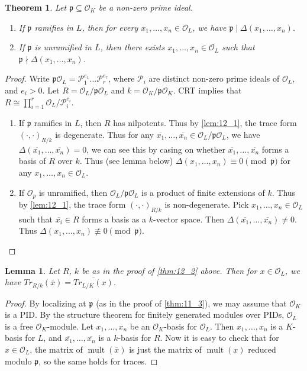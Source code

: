 \documentclass[11pt]{article}
\theoremstyle{definition}
\theoremstyle{plain}
\newtheorem{theorem}[definition]{Theorem}
\newtheorem*{lemma*}{Lemma}
\theoremstyle{remark}
\DeclareMathOperator{\mult}{mult}
\newcommand{\cO}{\mathcal{O}}
\newcommand{\cP}{\mathcal{P}}
\newcommand{\fp}{\mathfrak{p}}
\begin{document}
\begin{theorem}\label{thm:12_2}
    Let $\fp \subseteq \cO_K$ be a non-zero prime ideal.
    \begin{enumerate}
        \item If $\fp$ ramifies in $L$, then for every $x_1, \ldots, x_n \in \cO_L$, we have $\fp \mid \Delta(x_1, \ldots, x_n)$.
        \item If $\fp$ is unramified in $L$, then there exists $x_1, \ldots, x_n \in \cO_L$ such that $\fp \nmid \Delta(x_1, \ldots, x_n)$.
    \end{enumerate}
\end{theorem}
\begin{proof}
    Write $\fp \cO_L = \cP_1^{e_1} \ldots \cP_r^{e_r}$, where $\cP_i$ are distinct non-zero prime ideals of $\cO_L$, and $e_i > 0$. Let $R = \cO_L / \fp \cO_L$ and $k = \cO_K / \fp \cO_K$. CRT implies that $R \cong \prod_{i=1}^r \cO_L / \cP_i^{e_i}$.
    \begin{enumerate}
        \item If $\fp$ ramifies in $L$, then $R$ has nilpotents. Thus by \autoref{lem:12_1}, the trace form $(\cdot, \cdot)_{R/k}$ is degenerate. Thus for any $\overline{x_1}, \ldots, \overline{x_n} \in \cO_L / \fp \cO_L$, we have $\Delta(\overline{x_1}, \ldots, \overline{x_n}) = 0$, we can see this by casing on whether $\overline{x_1}, \ldots, \overline{x_n}$ forms a basis of $R$ over $k$. Thus (see lemma below) $\Delta(x_1, \ldots, x_n) \equiv 0 \pmod{\fp}$ for any $x_1, \ldots, x_n \in \cO_L$.

        \item If $\cO_p$ is unramified, then $\cO_L / \fp \cO_L$ is a product of finite extensions of $k$. Thus by \autoref{lem:12_1}, the trace form $(\cdot, \cdot)_{R/k}$ is non-degenerate. Pick $x_1, \ldots, x_n \in \cO_L$ such that $\overline{x_i} \in R$ forms a basis as a $k$-vector space. Then $\Delta(\overline{x_1}, \ldots, \overline{x_n}) \neq 0$. Thus $\Delta(x_1, \ldots, x_n) \not\equiv 0 \pmod{\fp}$. \qedhere
    \end{enumerate}
\end{proof}

\begin{lemma*}
    Let $R$, $k$ be as in the proof of \autoref{thm:12_2} above. Then for $x \in \cO_L$, we have $Tr_{R/k}(\overline{x}) = \overline{Tr_{L/K}(x)}$.
\end{lemma*}
\begin{proof}
    By localizing at $\fp$ (as in the proof of \autoref{thm:11_3}), we may assume that $\cO_K$ is a PID. By the structure theorem for finitely generated modules over PIDs, $\cO_L$ is a free $\cO_K$-module. Let $x_1, \ldots, x_n$ be an $\cO_K$-basis for $\cO_L$. Then $x_1, \ldots, x_n$ is a $K$-basis for $L$, and $\overline{x_1}, \ldots, \overline{x_n}$ is a $k$-basis for $R$. Now it is easy to check that for $x \in \cO_L$, the matrix of $\mult(\overline{x})$ is just the matrix of $\mult(x)$ reduced modulo $\fp$, so the same holds for traces.
\end{proof}
\end{document}
